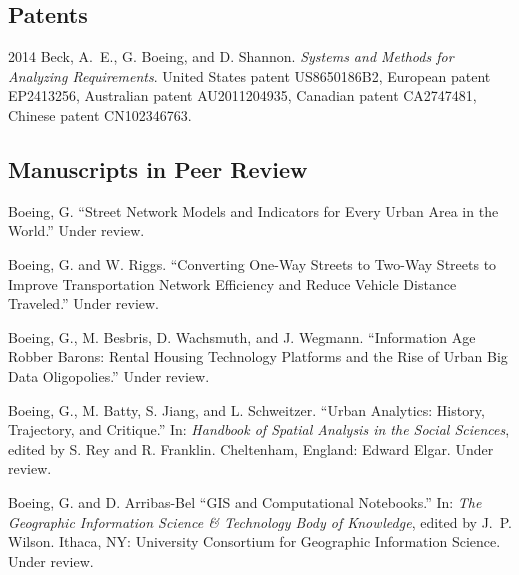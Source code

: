 \documentclass[12pt,letterpaper]{report}
\begin{document}
    \subsection*{Patents}

    \begin{tablist}

        \item[2014] \tab Beck, A.~E., G. Boeing, and D. Shannon. \textit{Systems and Methods for Analyzing Requirements}. United States patent US8650186B2, European patent EP2413256, Australian patent AU2011204935, Canadian patent CA2747481, Chinese patent CN102346763.

    \end{tablist}



    \subsection*{Manuscripts in Peer Review}

    \begin{tablist}

        \item[\the\year] \tab Boeing, G. \enquote{Street Network Models and Indicators for Every Urban Area in the World.} Under review.

        \item[\the\year] \tab Boeing, G. and W. Riggs. \enquote{Converting One-Way Streets to Two-Way Streets to Improve Transportation Network Efficiency and Reduce Vehicle Distance Traveled.} Under review.

        \item[\the\year] \tab Boeing, G., M. Besbris, D. Wachsmuth, and J. Wegmann. \enquote{Information Age Robber Barons: Rental Housing Technology Platforms and the Rise of Urban Big Data Oligopolies.} Under review.


        \item[\the\year] \tab Boeing, G., M. Batty, S. Jiang, and L. Schweitzer. \enquote{Urban Analytics: History, Trajectory, and Critique.} In: \textit{Handbook of Spatial Analysis in the Social Sciences}, edited by S. Rey and R. Franklin. Cheltenham, England: Edward Elgar. Under review.

        \item[\the\year] \tab Boeing, G. and D. Arribas-Bel \enquote{GIS and Computational Notebooks.} In: \textit{The Geographic Information Science \& Technology Body of Knowledge}, edited by J.~P. Wilson. Ithaca, NY: University Consortium for Geographic Information Science. Under review.

    \end{tablist}
\end{document}

